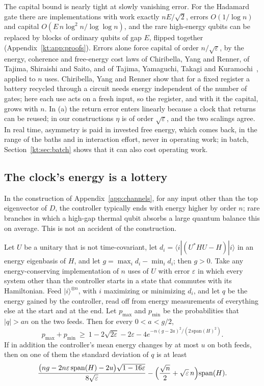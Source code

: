 The capital bound is nearly tight at slowly vanishing error. For the Hadamard gate there are implementations with work exactly $nE/\sqrt2$, errors $O(1/\log n)$ and capital $O(E\,n\log^2n/\log\log n)$, and the rare high-energy qubits can be replaced by blocks of ordinary qubits of gap $E$, flipped together (Appendix~\ref{kt:app:proofs}). Errors alone force capital of order $n/\sqrt\varepsilon$, by the energy, coherence and free-energy cost laws of Chiribella, Yang and Renner, of Tajima, Shiraishi and Saito, and of Tajima, Yamaguchi, Takagi and Kuramochi~\cite{ChiribellaYangRenner21,TSS20,TYTK25}, applied to $n$ uses. Chiribella, Yang and Renner show that for a fixed register a battery recycled through a circuit needs energy independent of the number of gates; here each use acts on a fresh input, so the register, and with it the capital, grows with $n$. In (a) the return error enters linearly because a clock that returns can be reused; in our constructions $\eta$ is of order $\sqrt\varepsilon$, and the two scalings agree. In real time, asymmetry is paid in invested free energy, which comes back, in the range of the baths and in interaction effort, never in operating work; in batch, Section~\ref{kt:sec:batch} shows that it can also cost operating work.

\subsection{The clock's energy is a lottery}\label{kt:sec:lottery}

In the construction of Appendix~\ref{app:channels}, for any input other than the top eigenvector of $D$, the controller typically ends with energy higher by order $n$; rare branches in which a high-gap thermal qubit absorbs a large quantum balance this on average. This is not an accident of the construction.

\begin{proposition}\label{kt:prop:lottery}
Let $U$ be a unitary that is not time-covariant, let $d_i=\langle i|(U^*HU-H)|i\rangle$ in an energy eigenbasis of $H$, and let $g=\max_id_i-\min_id_i$; then $g>0$. Take any energy-conserving implementation of $n$ uses of $U$ with error $\varepsilon$ in which every system other than the controller starts in a state that commutes with its Hamiltonian. Feed $|i\rangle^{\otimes n}$, with $i$ maximizing or minimizing $d_i$, and let $q$ be the energy gained by the controller, read off from energy measurements of everything else at the start and at the end. Let $p_{\max}$ and $p_{\min}$ be the probabilities that $|q|>an$ on the two feeds. Then for every $0<a<g/2$,
\[
p_{\max}+p_{\min}\ \ge\ 1-2\sqrt{2\varepsilon}-2\varepsilon-4e^{-n(g-2a)^2/(2\,\mathrm{span}(H)^2)}.
\]
If in addition the controller's mean energy changes by at most $u$ on both feeds, then on one of them the standard deviation of $q$ is at least
\[
\frac{\bigl(ng-2n\varepsilon\,\mathrm{span}(H)-2u\bigr)\sqrt{1-16\varepsilon}}{8\sqrt\varepsilon}-\Bigl(\frac{\sqrt n}2+\sqrt\varepsilon\,n\Bigr)\mathrm{span}(H).
\]
\end{proposition}

